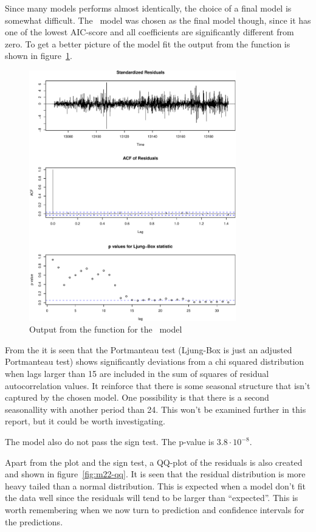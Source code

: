 Since many models performs almost identically, the choice of a final model is somewhat difficult. The \mtwentytwo\ model was chosen as the final model though, since it has one of the lowest AIC-score and all coefficients are significantly different from zero. To get a better picture of the model fit the output from the  function is shown in figure~\ref{fig:m22-tsdiag}.

\begin{figure}[!ht]
    \centering
    \includegraphics[width=90mm]{../plots/m22-tsdiag.pdf}
    \caption{Output from the  function for the \mtwentytwo\ model}
    \label{fig:m22-tsdiag}
\end{figure}

From the  it is seen that the Portmanteau test (Ljung-Box is just an adjusted Portmanteau test) shows significantly deviations from a chi squared distribution when lags larger than 15 are included in the sum of squares of residual autocorrelation values. It reinforce that there is some seasonal structure that isn't captured by the chosen model. One possibility is that there is a second seasonallity with another period than 24. This won't be examined further in this report, but it could be worth investigating.

The model also do not pass the sign test. The p-value is $3.8\cdot 10^{-8}$.

Apart from the  plot and the sign test, a QQ-plot of the residuals is also created and shown in figure~\ref{fig:m22-qq}. It is seen that the residual distribution is more heavy tailed than a normal distribution. This is expected when a model don't fit the data well since the residuals will tend to be larger than ``expected''. This is worth remembering when we now turn to prediction and confidence intervals for the predictions.

